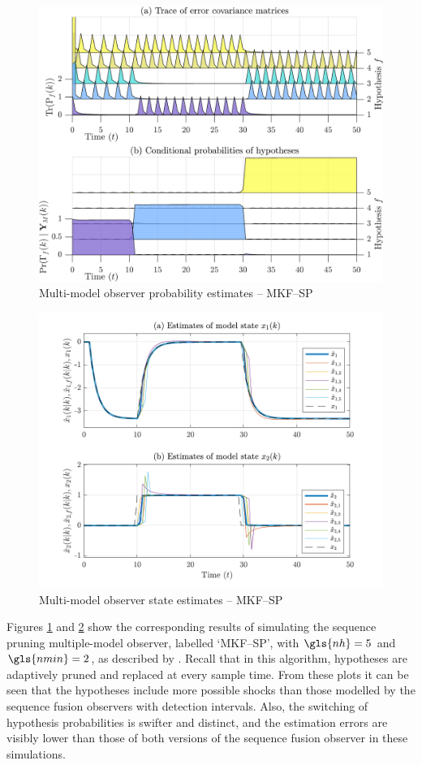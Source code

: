 \begin{figure}[htp]
	\centering
	\includegraphics[width=12cm]{images/rod_MKF_test_sim_MKF_SP_prob.png}
	\caption{Multi-model observer probability estimates – MKF--SP}
	\label{fig:rod-obs-sim-test-probs-SP}
\end{figure}
\begin{figure}[htp]
	\centering
	\includegraphics[width=13cm]{images/rod_MKF_test_sim_MKF_SP_x_est.pdf}
	\caption{Multi-model observer state estimates – MKF--SP}
	\label{fig:rod-obs-sim-test-x_est-SP}
\end{figure}
Figures \ref{fig:rod-obs-sim-test-probs-SP} and \ref{fig:rod-obs-sim-test-x_est-SP} show the corresponding results of simulating the sequence pruning multiple-model observer, labelled `MKF--SP', with $\gls{nh}=5$ and $\gls{nmin}=2$, as described by \cite{eriksson_classification_1996}. Recall that in this algorithm, hypotheses are adaptively pruned and replaced at every sample time. From these plots it can be seen that the hypotheses include more possible shocks than those modelled by the sequence fusion observers with detection intervals. Also, the switching of hypothesis probabilities is swifter and distinct, and the estimation errors are visibly lower than those of both versions of the sequence fusion observer in these simulations.

